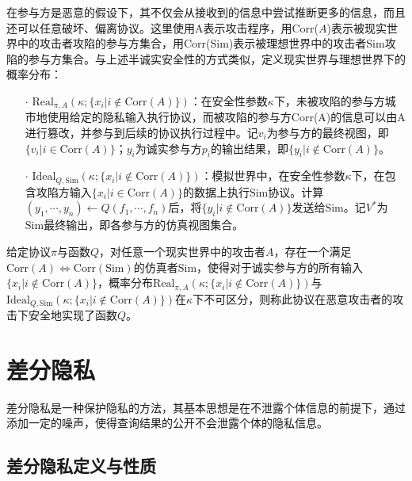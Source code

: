 在参与方是恶意的假设下，其不仅会从接收到的信息中尝试推断更多的信息，而且还可以任意破坏、偏离协议。这里使用A表示攻击程序，用Corr($A$)表示被现实世界中的攻击者攻陷的参与方集合，用Corr(Sim)表示被理想世界中的攻击者Sim攻陷的参与方集合。与上述半诚实安全性的方式类似，定义现实世界与理想世界下的概率分布：
\begin{itemize}
	\item [$\cdot$]
	$\text{Real}_{\pi,A}(\kappa;\{x_i|i\notin \text{Corr}(A)\})$：在安全性参数$\kappa$下，未被攻陷的参与方城市地使用给定的隐私输入执行协议，而被攻陷的参与方Corr(A)的信息可以由A进行篡改，并参与到后续的协议执行过程中。记$v_i$为参与方的最终视图，即$\{v_i|i\in \text{Corr}(A)\}$；$y_i$为诚实参与方$p_i$的输出结果，即$\{y_i|i\notin \text{Corr}(A)\}$。
	\item [$\cdot$]
	$\text{Ideal}_{Q,\text{Sim}}(\kappa;\{x_i|i\notin \text{Corr}(A)\})$：模拟世界中，在安全性参数$\kappa$下，在包含攻陷方输入$\{x_i|i\in \text{Corr}(A)\}$的数据上执行$\text{Sim}$协议。计算$(y_1,\cdots,y_n)\leftarrow Q(f_1,\cdots,f_n)$后，将$\{y_i|i\notin \text{Corr}(A)\}$发送给$\text{Sim}$。记$V^*$为$\text{Sim}$最终输出，即各参与方的仿真视图集合。
\end{itemize}

\begin{definition}{}
	给定协议$\pi$与函数$Q$，对任意一个现实世界中的攻击者$A$，存在一个满足$\text{Corr}(A)\Longleftrightarrow \text{Corr}(\text{Sim})$的仿真者$\text{Sim}$，使得对于诚实参与方的所有输入$\{x_i|i\notin \text{Corr}(A)\}$，概率分布$\text{Real}_{\pi,A}(\kappa;\{x_i|i\notin \text{Corr}(A)\})$与$\text{Ideal}_{Q,\text{Sim}}(\kappa;\{x_i|i\notin \text{Corr}(A)\})$在$\kappa$下不可区分，则称此协议在恶意攻击者的攻击下安全地实现了函数$Q$。
\end{definition}

\section{差分隐私}

差分隐私\cite{DP}是一种保护隐私的方法，其基本思想是在不泄露个体信息的前提下，通过添加一定的噪声，使得查询结果的公开不会泄露个体的隐私信息。

\subsection{差分隐私定义与性质}


